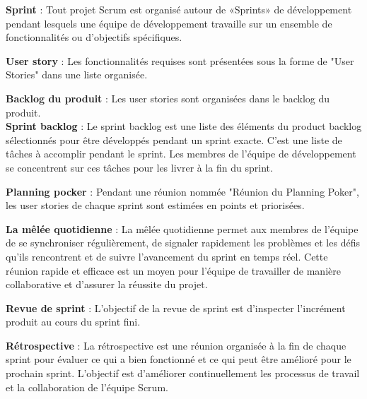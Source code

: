 \noindent\textbf{Sprint} : Tout projet Scrum est organisé autour de «Sprints» de développement pendant lesquels une équipe de développement travaille sur un ensemble de fonctionnalités ou d'objectifs spécifiques.

\noindent\textbf{User story} : Les fonctionnalités requises sont présentées sous la forme de "User Stories" dans une liste organisée.

\noindent\textbf{Backlog du produit} : Les user stories sont organisées dans le backlog du produit.\\

\noindent\textbf{Sprint backlog} : Le sprint backlog est une liste des éléments du product backlog sélectionnés pour être développés pendant un sprint exacte. C'est une liste de tâches à accomplir pendant le sprint. Les membres de l'équipe de développement se concentrent sur ces tâches pour les livrer à la fin du sprint.

\noindent\textbf{Planning pocker} : Pendant une réunion nommée "Réunion du Planning Poker", les user stories de chaque sprint sont estimées en points et priorisées.

\noindent\textbf{La mêlée quotidienne} : La mêlée quotidienne permet aux membres de l'équipe de se synchroniser régulièrement, de signaler rapidement les problèmes et les défis qu'ils rencontrent et de suivre l'avancement du sprint en temps réel. Cette réunion rapide et efficace est un moyen pour l'équipe de travailler de manière collaborative et d'assurer la réussite du projet.

\noindent\textbf{Revue de sprint} : L’objectif de la revue de sprint est d’inspecter l’incrément produit au cours du sprint fini.

\noindent\textbf{Rétrospective} : La rétrospective est une réunion organisée à la fin de chaque sprint pour évaluer ce qui a bien fonctionné et ce qui peut être amélioré pour le prochain sprint. L'objectif est d'améliorer continuellement les processus de travail et la collaboration de l'équipe Scrum.


